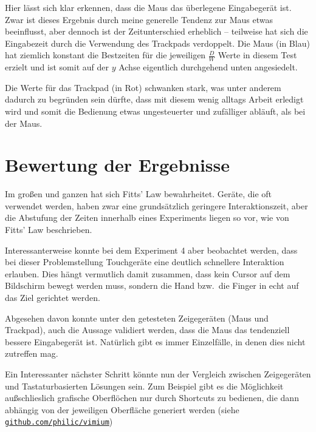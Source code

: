 \documentclass{article}
\begin{document}
Hier lässt sich klar erkennen, dass die Maus das überlegene Eingabegerät ist.
Zwar ist dieses Ergebnis durch meine generelle Tendenz zur Maus etwas beeinflusst,
aber dennoch ist der Zeitunterschied erheblich – teilweise hat sich die Eingabezeit
durch die Verwendung des Trackpads verdoppelt. Die Maus (in Blau) hat ziemlich
konstant die Bestzeiten für die jeweiligen $\frac{D}{W}$ Werte in diesem Test
erzielt und ist somit auf der $y$ Achse eigentlich durchgehend unten angesiedelt.

Die Werte für das Trackpad (in Rot) schwanken stark, was unter anderem dadurch
zu begründen sein dürfte, dass mit diesem wenig alltags Arbeit erledigt wird
und somit die Bedienung etwas ungesteuerter und zufälliger abläuft, als bei der
Maus.

\section{Bewertung der Ergebnisse}

Im großen und ganzen hat sich Fitts' Law bewahrheitet. Geräte, die oft verwendet
werden, haben zwar eine grundsätzlich geringere Interaktionszeit, aber die
Abstufung der Zeiten innerhalb eines Experiments liegen so vor, wie von Fitts'
Law beschrieben.

Interessanterweise konnte bei dem Experiment 4 aber beobachtet werden, dass bei
dieser Problemstellung Touchgeräte eine deutlich schnellere Interaktion erlauben.
Dies hängt vermutlich damit zusammen, dass kein Cursor auf dem Bildschirm bewegt
werden muss, sondern die Hand bzw.\ die Finger in echt auf das Ziel gerichtet
werden.

Abgesehen davon konnte unter den getesteten Zeigegeräten (Maus und Trackpad),
auch die Aussage validiert werden, dass die Maus das tendenziell bessere
Eingabegerät ist. Natürlich gibt es immer Einzelfälle, in denen dies nicht
zutreffen mag.

Ein Interessanter nächster Schritt könnte nun der Vergleich zwischen
Zeigegeräten und Tastaturbasierten Lösungen sein. Zum Beispiel gibt es die
Möglichkeit außschlieslich grafische Oberflöchen nur durch Shortcuts zu bedienen,
die dann abhängig von der jeweiligen Oberfläche generiert werden (siehe
\href{https://github.com/philc/vimium}{\texttt{github.com/philic/vimium}})


\end{document}
